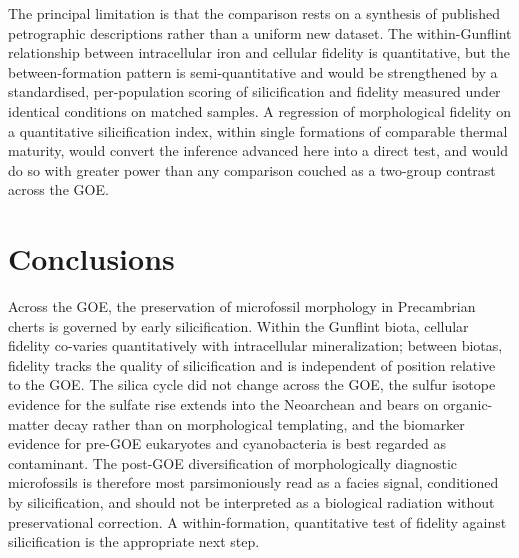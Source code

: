 \documentclass[11pt]{article}
\begin{document}
The principal limitation is that the comparison rests on a synthesis of published petrographic
descriptions rather than a uniform new dataset. The within-Gunflint relationship between intracellular
iron and cellular fidelity \citep{Lepot2017} is quantitative, but the between-formation pattern is
semi-quantitative and would be strengthened by a standardised, per-population scoring of
silicification and fidelity measured under identical conditions on matched samples. A regression of
morphological fidelity on a quantitative silicification index, within single formations of comparable
thermal maturity, would convert the inference advanced here into a direct test, and would do so with
greater power than any comparison couched as a two-group contrast across the GOE.

\section{Conclusions}

Across the GOE, the preservation of microfossil morphology in Precambrian cherts is governed by
early silicification. Within the Gunflint biota, cellular fidelity co-varies quantitatively with
intracellular mineralization; between biotas, fidelity tracks the quality of silicification and is
independent of position relative to the GOE. The silica cycle did not change across the GOE, the
sulfur isotope evidence for the sulfate rise extends into the Neoarchean and bears on organic-matter
decay rather than on morphological templating, and the biomarker evidence for pre-GOE eukaryotes and
cyanobacteria is best regarded as contaminant. The post-GOE diversification of morphologically
diagnostic microfossils is therefore most parsimoniously read as a facies signal, conditioned by
silicification, and should not be interpreted as a biological radiation without preservational
correction. A within-formation, quantitative test of fidelity against silicification is the
appropriate next step.
\end{document}
